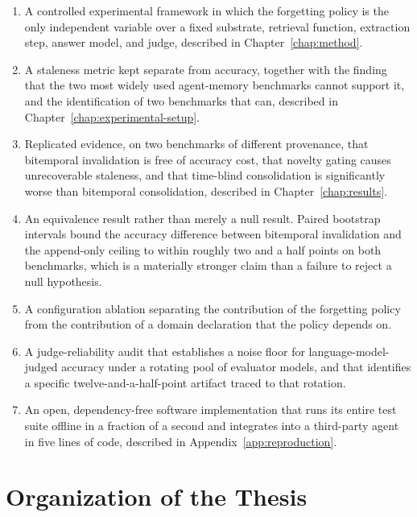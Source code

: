 \begin{enumerate}
\item A controlled experimental framework in which the forgetting policy is the only independent variable over a fixed substrate, retrieval function, extraction step, answer model, and judge, described in Chapter~\ref{chap:method}.
\item A staleness metric kept separate from accuracy, together with the finding that the two most widely used agent-memory benchmarks cannot support it, and the identification of two benchmarks that can, described in Chapter~\ref{chap:experimental-setup}.
\item Replicated evidence, on two benchmarks of different provenance, that bitemporal invalidation is free of accuracy cost, that novelty gating causes unrecoverable staleness, and that time-blind consolidation is significantly worse than bitemporal consolidation, described in Chapter~\ref{chap:results}.
\item An equivalence result rather than merely a null result. Paired bootstrap intervals bound the accuracy difference between bitemporal invalidation and the append-only ceiling to within roughly two and a half points on both benchmarks, which is a materially stronger claim than a failure to reject a null hypothesis.
\item A configuration ablation separating the contribution of the forgetting policy from the contribution of a domain declaration that the policy depends on.
\item A judge-reliability audit that establishes a noise floor for language-model-judged accuracy under a rotating pool of evaluator models, and that identifies a specific twelve-and-a-half-point artifact traced to that rotation.
\item An open, dependency-free software implementation that runs its entire test suite offline in a fraction of a second and integrates into a third-party agent in five lines of code, described in Appendix~\ref{app:reproduction}.
\end{enumerate}

\section{Organization of the Thesis}
\label{sec:organization}

